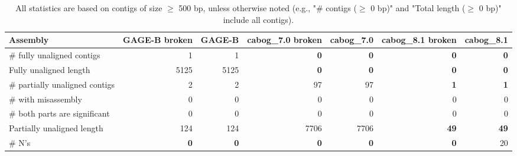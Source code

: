\documentclass[12pt,a4paper]{article}
\begin{document}
\begin{table}[ht]
\begin{center}
\caption{All statistics are based on contigs of size $\geq$ 500 bp, unless otherwise noted (e.g., "\# contigs ($\geq$ 0 bp)" and "Total length ($\geq$ 0 bp)" include all contigs).}
\begin{tabular}{|l*{6}{|r}|}
\hline
Assembly & GAGE-B broken & GAGE-B & cabog\_7.0 broken & cabog\_7.0 & cabog\_8.1 broken & cabog\_8.1 \\ \hline
\# fully unaligned contigs & 1 & 1 & {\bf 0} & {\bf 0} & {\bf 0} & {\bf 0} \\ \hline
Fully unaligned length & 5125 & 5125 & {\bf 0} & {\bf 0} & {\bf 0} & {\bf 0} \\ \hline
\# partially unaligned contigs & 2 & 2 & 97 & 97 & {\bf 1} & {\bf 1} \\ \hline
\hspace{5mm}\# with misassembly & 0 & 0 & 0 & 0 & 0 & 0 \\ \hline
\hspace{5mm}\# both parts are significant & 0 & 0 & 0 & 0 & 0 & 0 \\ \hline
Partially unaligned length & 124 & 124 & 7706 & 7706 & {\bf 49} & {\bf 49} \\ \hline
\# N's & {\bf 0} & {\bf 0} & {\bf 0} & {\bf 0} & {\bf 0} & 20 \\ \hline
\end{tabular}
\end{center}
\end{table}
\end{document}
